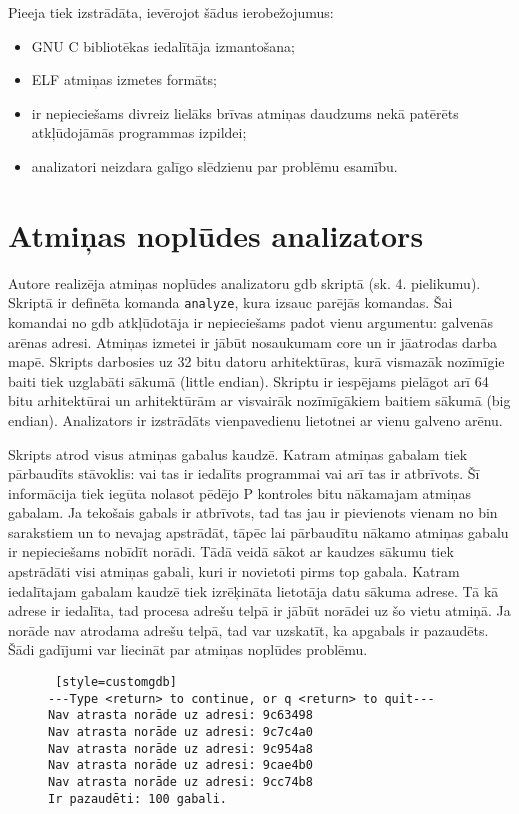 Pieeja tiek izstrādāta, ievērojot šādus ierobežojumus: %
\begin{itemize}
	\item GNU C bibliotēkas iedalītāja izmantošana;
    \item ELF atmiņas izmetes formāts;
    \item ir nepieciešams divreiz lielāks brīvas atmiņas daudzums nekā patērēts atkļūdojāmās programmas izpildei;
    \item analizatori neizdara galīgo slēdzienu par problēmu esamību.
\end{itemize}



\section{Atmiņas noplūdes analizators}
Autore realizēja atmiņas noplūdes analizatoru gdb skriptā (sk. 4. pielikumu). Skriptā ir definēta komanda \texttt{analyze}, kura izsauc parējās komandas.
Šai komandai no gdb atkļūdotāja ir nepieciešams padot vienu argumentu: galvenās arēnas adresi.
Atmiņas izmetei ir jābūt nosaukumam core un ir jāatrodas darba mapē.
Skripts darbosies uz 32 bitu datoru arhitektūras, kurā vismazāk nozīmīgie baiti tiek uzglabāti sākumā (little endian).
Skriptu ir iespējams pielāgot arī 64 bitu arhitektūrai un arhitektūrām ar visvairāk nozīmīgākiem baitiem sākumā (big endian).
Analizators ir izstrādāts vienpavedienu lietotnei ar vienu galveno arēnu.



Skripts atrod visus atmiņas gabalus kaudzē. 
Katram atmiņas gabalam tiek pārbaudīts stāvoklis: vai tas ir iedalīts programmai vai arī tas ir atbrīvots.
Šī informācija tiek iegūta nolasot pēdējo P kontroles bitu nākamajam atmiņas gabalam.
Ja tekošais gabals ir atbrīvots, tad tas jau ir pievienots vienam no bin sarakstiem un to nevajag apstrādāt, tāpēc lai pārbaudītu nākamo atmiņas gabalu ir nepieciešams nobīdīt norādi.
Tādā veidā sākot ar kaudzes sākumu tiek apstrādāti visi atmiņas gabali, kuri ir novietoti pirms top gabala.
Katram iedalītajam gabalam kaudzē tiek izrēķināta lietotāja datu sākuma adrese.
Tā kā adrese ir iedalīta, tad procesa adrešu telpā ir jābūt norādei uz šo vietu atmiņā.
Ja norāde nav atrodama adrešu telpā, tad var uzskatīt, ka apgabals ir pazaudēts.
Šādi gadījumi var liecināt par atmiņas noplūdes problēmu.

\begin{figure}[h]
\begin{lstlisting} [style=customgdb]
---Type <return> to continue, or q <return> to quit---
Nav atrasta norāde uz adresi: 9c63498
Nav atrasta norāde uz adresi: 9c7c4a0
Nav atrasta norāde uz adresi: 9c954a8
Nav atrasta norāde uz adresi: 9cae4b0
Nav atrasta norāde uz adresi: 9cc74b8
Ir pazaudēti: 100 gabali.
\end{lstlisting}
\caption{\textbf{\fontsize{11}{12}\selectfont {Atmiņas noplūdes atrašana, gdb skripta izvads}}}
\end{figure} %

